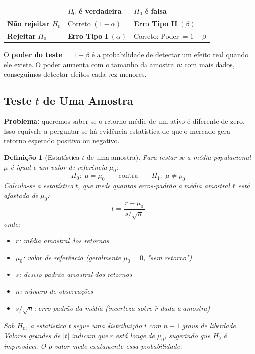 \documentclass[11pt,a4paper]{article}
\theoremstyle{quant}
\newtheorem{definicao}{Definição}[section]
\begin{document}
\vspace{0.4em}
\begin{center}
\begin{tabularx}{0.9\textwidth}{@{}lXX@{}}
\toprule
& \textcolor{quantpurple}{\textbf{$H_0$ é verdadeira}} &
  \textcolor{quantpurple}{\textbf{$H_0$ é falsa}} \\
\midrule
\textbf{Não rejeitar $H_0$} &
  Correto $(1-\alpha)$ &
  \textcolor{quantred}{\textbf{Erro Tipo II}} $(\beta)$\\[6pt]
\textbf{Rejeitar $H_0$} &
  \textcolor{quantred}{\textbf{Erro Tipo I}} $(\alpha)$ &
  Correto: Poder $= 1-\beta$ \\
\bottomrule
\end{tabularx}
\end{center}
\vspace{0.4em}

O \textbf{poder do teste} $= 1 - \beta$ é a probabilidade de detectar um efeito
real quando ele existe. O poder aumenta com o tamanho da amostra $n$: com mais dados,
conseguimos detectar efeitos cada vez menores.

\subsection{Teste $t$ de Uma Amostra}

\textbf{Problema:} queremos saber se o retorno médio de um ativo é diferente de zero.
Isso equivale a perguntar se há evidência estatística de que o mercado gera retorno
esperado positivo ou negativo.

\begin{definicao}[Estatística $t$ de uma amostra]
Para testar se a média populacional $\mu$ é igual a um valor de referência $\mu_0$:
\[
  H_0:\; \mu = \mu_0 \qquad \text{contra} \qquad H_1:\; \mu \neq \mu_0
\]
Calcula-se a estatística $t$, que mede quantos erros-padrão a média amostral
$\bar{r}$ está afastada de $\mu_0$:
\[
  t = \frac{\bar{r} - \mu_0}{\,s \big/ \sqrt{n}\,}
\]
onde:
\begin{itemize}
  \item $\bar{r}$: média amostral dos retornos
  \item $\mu_0$: valor de referência (geralmente $\mu_0 = 0$, "sem retorno")
  \item $s$: desvio-padrão amostral dos retornos
  \item $n$: número de observações
  \item $s/\sqrt{n}$: erro-padrão da média (incerteza sobre $\bar{r}$ dada a amostra)
\end{itemize}

Sob $H_0$, a estatística $t$ segue uma distribuição $t$ com $n-1$ graus de liberdade.
Valores grandes de $|t|$ indicam que $\bar{r}$ está longe de $\mu_0$, sugerindo
que $H_0$ é improvável. O $p$-valor mede exatamente essa probabilidade.
\end{definicao}
\end{document}
